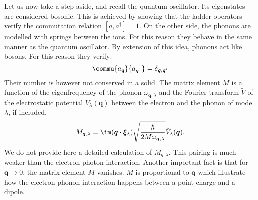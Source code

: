 \documentclass[../main.tex]{subfile}
\begin{document}
Let us now take a step aside, and recall the quantum oscillator. Its eigenstates are considered bosonic. This is achieved by showing that the ladder operators
verify the commutation relation $[a,a^{\dagger}] = 1$. On the other side, the phonons are modelled with springs between the ions. For this reason they
behave in the same manner as the quantum oscillator. By extension of this idea, phonons act like bosons. For this reason they verify:
\[
    \commu{a_{\bm{q}}}{a_{\bm{q}^{\dagger}}} = \delta_{\bm{q},\bm{q}'}
\] 
Their number is however not conserved in a solid. The matrix element $M$ is a function of the eigenfrequency 
of the phonon $\omega_{\bm{q},\lambda}$ and the Fourier transform $\tilde{V}$ of the electrostatic potential $V_{\lambda}(\bm{q})$ between the electron
and the phonon of mode $\lambda$, if included.
\[
    M_{\bm{q},\lambda} = \im (\bm{q}\cdot \bm{\xi}_{\lambda}) \sqrt{\frac{\hbar}{2M\omega_{\bm{q},\lambda}}} \tilde{V}_{\lambda}(\bm{q}).
\]
We do not provide here a detailed calculation of $M_{q,\lambda}$. This pairing is much weaker than the electron-photon interaction. 
Another important fact is that for $\bm{q}\rightarrow 0$, the matrix element $M$ vanishes. $M$ is proportional to $\bm{q}$ which illustrate how the electron-phonon interaction
happens between a point charge and a dipole.\\
\end{document}
